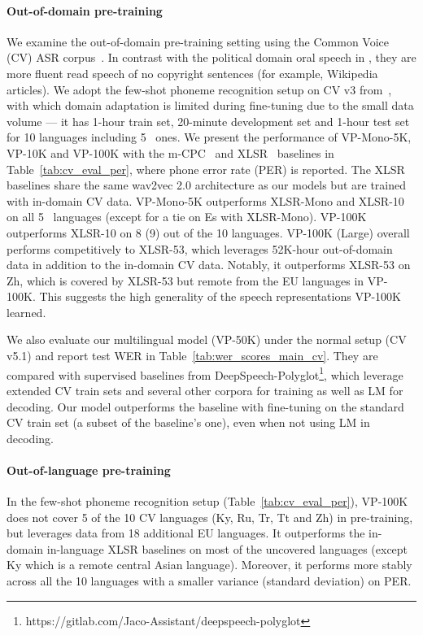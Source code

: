 \paragraph{Out-of-domain pre-training} We examine the out-of-domain pre-training setting using the Common Voice (CV) ASR corpus~\citep{ardila-etal-2020-common}. In contrast with the political domain oral speech in \vp, they are more fluent read speech of no copyright sentences (for example, Wikipedia articles). We adopt the few-shot phoneme recognition setup on CV v3 from~\citet{riviere2020unsupervised}, with which domain adaptation is limited during fine-tuning due to the small data volume --- it has 1-hour train set, 20-minute development set and 1-hour test set for 10 languages including 5 \vp~ones. We present the performance of VP-Mono-5K, VP-10K and VP-100K with the m-CPC~\citep{riviere2020unsupervised} and XLSR~\citep{conneau2020unsupervised} baselines in Table~\ref{tab:cv_eval_per}, where phone error rate (PER) is reported. The XLSR baselines share the same wav2vec 2.0 architecture as our models but are trained with in-domain CV data. VP-Mono-5K outperforms XLSR-Mono and XLSR-10 on all 5 \vp~languages (except for a tie on Es with XLSR-Mono). VP-100K outperforms XLSR-10 on 8 (9) out of the 10 languages. VP-100K (Large) overall performs competitively to XLSR-53, which leverages 52K-hour out-of-domain data in addition to the in-domain CV data. Notably, it outperforms XLSR-53 on Zh, which is covered by XLSR-53 but remote from the EU languages in VP-100K. This suggests the high generality of the speech representations VP-100K learned.

We also evaluate our multilingual model (VP-50K) under the normal setup (CV v5.1) and report test WER in Table~\ref{tab:wer_scores_main_cv}. 
They are compared with supervised baselines from  DeepSpeech-Polyglot\footnote{https://gitlab.com/Jaco-Assistant/deepspeech-polyglot}, which leverage extended CV train sets and several other corpora for training as well as LM for decoding. Our model outperforms the baseline with fine-tuning on the standard CV train set (a subset of the baseline's one), even when not using LM in decoding.

\paragraph{Out-of-language pre-training}
In the few-shot phoneme recognition setup (Table~\ref{tab:cv_eval_per}), VP-100K does not cover 5 of the 10 CV languages (Ky, Ru, Tr, Tt and Zh) in pre-training, but leverages data from 18 additional EU languages. It outperforms the in-domain in-language XLSR baselines on most of the uncovered languages (except Ky which is a remote central Asian language). Moreover, it performs more stably across all the 10 languages with a smaller variance (standard deviation) on PER.

